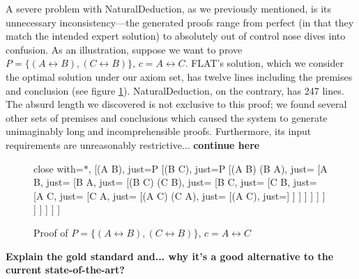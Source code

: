 \documentclass[ms]{uncgdissertationexp2}
\theoremstyle{plain}
\theoremstyle{definition}
\theoremstyle{remark}
\begin{document}
A severe problem with NaturalDeduction, as we previously mentioned, is its unnecessary inconsistency---the generated proofs range from perfect (in that they match the intended expert solution) to absolutely out of control nose dives into confusion. As an illustration, suppose we want to prove $P = \{(A \leftrightarrow B), (C \leftrightarrow B)\}$, $c = A\leftrightarrow C$. FLAT's solution, which we consider the optimal solution under our axiom set, has twelve lines including the premises and conclusion (see figure \ref{fig:long-ass-proof}). NaturalDeduction, on the contrary, has 247 lines. The absurd length we discovered is not exclusive to this proof; we found several other sets of premises and conclusions which caused the system to generate unimaginably long and incomprehensible proofs. Furthermore, its input requirements are unreasonably restrictive... \textbf{continue here}
\begin{figure}[!ht]
	\caption{Proof of $P = \{(A \leftrightarrow B), (C \leftrightarrow B)\}$, $c = A\leftrightarrow C$}
	\label{fig:long-ass-proof}
	\begin{center}
	\renewcommand*\linenumberstyle[1]{#1.}
		\begin{prooftree}
			{
			close with={\ensuremath{\ast}},
			}
			[(A \leftrightarrow B), just=P
				[(B \leftrightarrow C), just=P
					[(A \to B) \land (B \to A), just= %
						[A \to B, just= %
							[B \to A, just= %
								[(B \to C) \land (C \to B), just=\text{2 BCB} %
									[B \to C, just=\text{6 $\land$E} %
										[C \to B, just= %
											[A \to C, just=\text{4, 7 HS} %
												[C \to A, just=\text{3, 8 HS} %
													[(A \to C) \land (C \to A), just=\text{9, 10 $\land$I} %
														[(A \leftrightarrow C), just=] %
													]
												]
											]
										]
									]
								]
							]
						]
					]
				]
			]
		\end{prooftree}
	\end{center}
\end{figure}

\textbf{Explain the gold standard and... why it's a good alternative to the current state-of-the-art?}



\nocite{*}

\appendix
\end{document}
